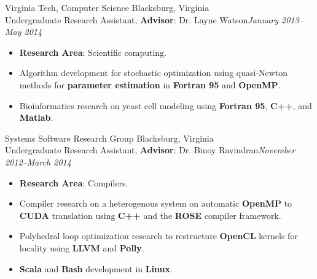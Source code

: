 \documentclass[letter]{article}
\begin{document}
    \begin{minipage}{\textwidth}
    \bigskip
  
    {\large Virginia Tech, Computer Science } \hfill Blacksburg, Virginia \\
    Undergraduate Research Assistant, {\bf Advisor}: Dr. Layne Watson\hfill {\it January 2013--May 2014}\begin{itemize}
      
        \item {\bf Research Area}: Scientific computing.
      
        \item Algorithm development for stochastic optimization using quasi-Newton methods for {\bf parameter estimation} in {\bf Fortran 95} and {\bf OpenMP}.
      
        \item Bioinformatics research on yeast cell modeling using {\bf Fortran 95}, {\bf C++}, and {\bf Matlab}.
      
      \end{itemize}\end{minipage}
    \begin{minipage}{\textwidth}
    \bigskip
  
    {\large Systems Software Research Group } \hfill Blacksburg, Virginia \\
    Undergraduate Research Assistant, {\bf Advisor}: Dr. Binoy Ravindran\hfill {\it November 2012--March 2014}\begin{itemize}
      
        \item {\bf Research Area}: Compilers.
      
        \item Compiler research on a heterogenous system on automatic {\bf OpenMP} to {\bf CUDA} translation using {\bf C++} and the {\bf ROSE} compiler framework.
      
        \item Polyhedral loop optimization research to restructure {\bf OpenCL} kernels for locality using {\bf LLVM} and {\bf Polly}.
      
        \item {\bf Scala} and {\bf Bash} development in {\bf Linux}.
      
      \end{itemize}\end{minipage}
    \begin{minipage}{\textwidth}
    \bigskip
  

\end{minipage}\medskip
\end{document}
